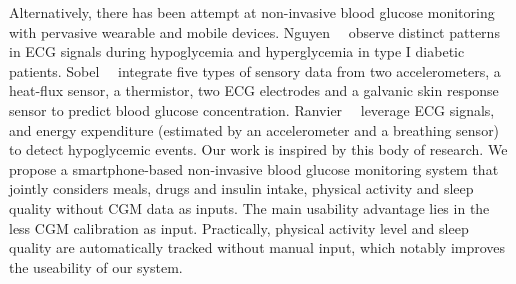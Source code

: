 Alternatively, there has been attempt at non-invasive blood glucose monitoring with pervasive wearable and mobile devices.
Nguyen~\etal~\cite{bib:EMBC12:Nguyen} observe distinct patterns in ECG signals during hypoglycemia and hyperglycemia in type I diabetic patients.
Sobel~\etal~\cite{bib:JDST14:Sobel} integrate five types of sensory data from two accelerometers, a heat-flux sensor, a thermistor, two ECG electrodes and a galvanic skin response sensor to predict blood glucose concentration.
Ranvier~\etal~\cite{bib:SEMPER16:Ranvier} leverage ECG signals, and energy expenditure (estimated by an accelerometer and a breathing sensor) to detect hypoglycemic events.
Our work is inspired by this body of research. We propose a smartphone-based non-invasive blood glucose monitoring system that jointly considers meals, drugs and insulin intake, physical activity and sleep quality without CGM data as inputs. \textcolor[rgb]{1.00,0.00,0.00}{The main usability advantage lies in the less CGM calibration as input. }
Practically, physical activity level and sleep quality are automatically tracked without manual input, which notably improves the useability of our system.


